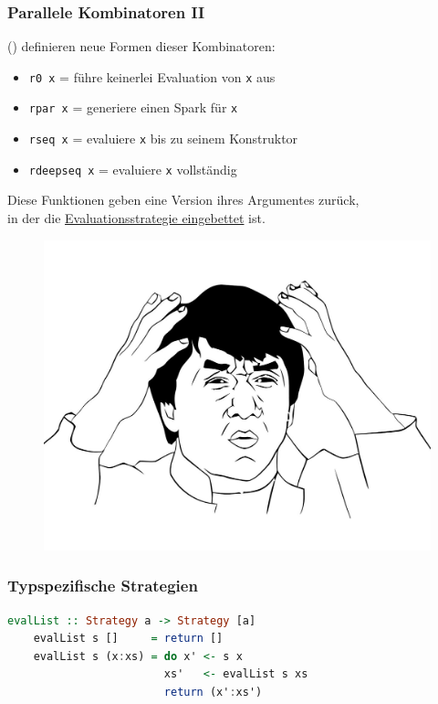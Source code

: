 \documentclass[presentation, shownotes]{beamer}
\begin{document}
\begin{frame}
\frametitle{Parallele Kombinatoren II}
    \citeauthor{marlow2010seq} (\citeyear{marlow2010seq}) definieren neue Formen dieser Kombinatoren:
    \begin{itemize}
        \item {\color{blue}\texttt{r0 x}} = führe keinerlei Evaluation von \texttt{x} aus
        \item {\color{blue}\texttt{rpar x}} = generiere einen Spark für \texttt{x}
        \item {\color{blue}\texttt{rseq x}} = evaluiere \texttt{x} bis zu seinem Konstruktor
        \item {\color{blue}\texttt{rdeepseq x}} = evaluiere \texttt{x} vollständig
    \end{itemize}
    \bigskip
    Diese Funktionen geben eine Version ihres Argumentes zurück,\\in der die \underline{Evaluationsstrategie eingebettet} ist.
\end{frame}

\begin{frame}[plain]{}
\begin{figure}
\centering
\includegraphics[height=.7\textheight]{but_why}
\end{figure}
\end{frame}

\begin{frame}[fragile]
    \frametitle{Typspezifische Strategien}
    \begin{lstlisting}[language=haskell]
    evalList :: Strategy a -> Strategy [a]
    evalList s []     = return []
    evalList s (x:xs) = do x' <- s x
                        xs'   <- evalList s xs
                        return (x':xs')
    \end{lstlisting}
\end{frame}
\end{document}
